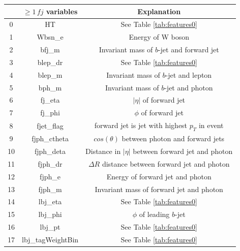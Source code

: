 \begin{table}
    \centering
    \begin{tabular}{c|c|c}
        \toprule
        {} &                     $\geq 1\, fj$ variables & Explanation\\
        \midrule
        0  &                                HT  & See Table \ref{tab:features0} \\\hline
        1  &                            Wbsn\_e & Energy of W boson\\\hline
        2  &                             bfj\_m & Invariant mass of $b$-jet and forward jet\\\hline
        3  &                           blep\_dr & See Table \ref{tab:features0}\\\hline
        4  &                            blep\_m & Invariant mass of $b$-jet and lepton\\\hline
        5  &                             bph\_m & Invariant mass of $b$-jet and photon\\\hline
        6  &                            fj\_eta & $|\eta|$ of forward jet\\\hline
        7  &                            fj\_phi & $\phi$ of forward jet\\\hline
        8  &                         fjet\_flag & forward jet is jet with highest $p_T$ in event\\\hline
        9  &                       fjph\_ctheta & $cos(\theta)$ between photon and forward jets\\\hline
        10 &                         fjph\_deta & Distance in $|\eta|$ between forward jet and photon\\\hline
        11 &                           fjph\_dr & $\Delta R$ distance between forward jet and photon\\\hline
        12 &                            fjph\_e & Energy of forward jet and photon\\\hline
        13 &                            fjph\_m & Invariant mass of forward jet and photon\\\hline
        14 &                           lbj\_eta & See Table \ref{tab:features0}\\\hline
        15 &                           lbj\_phi & $\phi$ of leading $b$-jet\\\hline
        16 &                            lbj\_pt & See Table \ref{tab:features0}\\\hline
        17 &  lbj\_tagWeightBin&                  See Table \ref{tab:features0}\\

\end{tabular}
\end{table}
